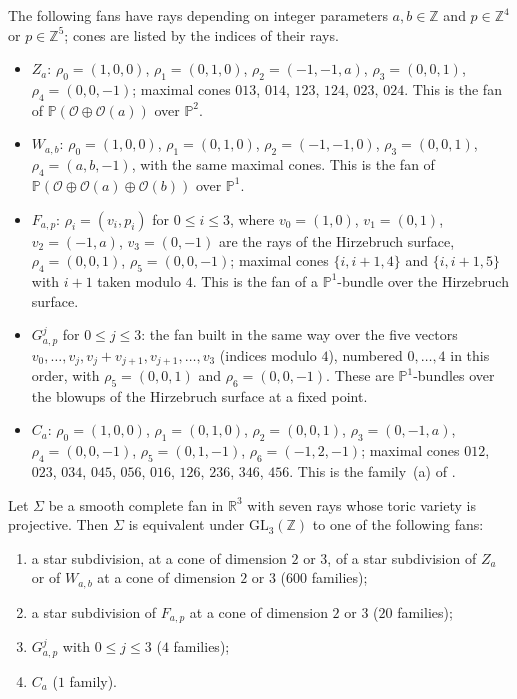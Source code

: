 \documentclass[12pt]{article}
\newcommand{\R}{\mathbb{R}}
\newcommand{\Z}{\mathbb{Z}}
\newcommand{\GL}{\mathrm{GL}}
\begin{document}
The following fans have rays depending on integer parameters $a,b\in\Z$ and $p\in\Z^4$ or $p\in\Z^5$; cones are listed by the indices of their rays.
\begin{itemize}
\item $Z_a$: $\rho_0=(1,0,0)$, $\rho_1=(0,1,0)$, $\rho_2=(-1,-1,a)$, $\rho_3=(0,0,1)$, $\rho_4=(0,0,-1)$; maximal cones $013$, $014$, $123$, $124$, $023$, $024$. This is the fan of $\mathbb{P}(\mathcal{O}\oplus\mathcal{O}(a))$ over $\mathbb{P}^2$.
\item $W_{a,b}$: $\rho_0=(1,0,0)$, $\rho_1=(0,1,0)$, $\rho_2=(-1,-1,0)$, $\rho_3=(0,0,1)$, $\rho_4=(a,b,-1)$, with the same maximal cones. This is the fan of $\mathbb{P}(\mathcal{O}\oplus\mathcal{O}(a)\oplus\mathcal{O}(b))$ over $\mathbb{P}^1$.
\item $F_{a,p}$: $\rho_i=(v_i,p_i)$ for $0\le i\le3$, where $v_0=(1,0)$, $v_1=(0,1)$, $v_2=(-1,a)$, $v_3=(0,-1)$ are the rays of the Hirzebruch surface, $\rho_4=(0,0,1)$, $\rho_5=(0,0,-1)$; maximal cones $\{i,i+1,4\}$ and $\{i,i+1,5\}$ with $i+1$ taken modulo $4$. This is the fan of a $\mathbb{P}^1$-bundle over the Hirzebruch surface.
\item $G^j_{a,p}$ for $0\le j\le3$: the fan built in the same way over the five vectors $v_0,\dots,v_j,v_j+v_{j+1},v_{j+1},\dots,v_3$ (indices modulo $4$), numbered $0,\dots,4$ in this order, with $\rho_5=(0,0,1)$ and $\rho_6=(0,0,-1)$. These are $\mathbb{P}^1$-bundles over the blowups of the Hirzebruch surface at a fixed point.
\item $C_a$: $\rho_0=(1,0,0)$, $\rho_1=(0,1,0)$, $\rho_2=(0,0,1)$, $\rho_3=(0,-1,a)$, $\rho_4=(0,0,-1)$, $\rho_5=(0,1,-1)$, $\rho_6=(-1,2,-1)$; maximal cones $012$, $023$, $034$, $045$, $056$, $016$, $126$, $236$, $346$, $456$. This is the family~(a) of \cite[Section~3]{FP05}.
\end{itemize}

\begin{proposition}\label{prop:classification}
Let $\Sigma$ be a smooth complete fan in $\R^3$ with seven rays whose toric variety is projective. Then $\Sigma$ is equivalent under $\GL_3(\Z)$ to one of the following fans:
\begin{enumerate}
\item[(i)] a star subdivision, at a cone of dimension $2$ or $3$, of a star subdivision of $Z_a$ or of $W_{a,b}$ at a cone of dimension $2$ or $3$ ($600$ families);
\item[(ii)] a star subdivision of $F_{a,p}$ at a cone of dimension $2$ or $3$ ($20$ families);
\item[(iii)] $G^j_{a,p}$ with $0\le j\le3$ ($4$ families);
\item[(iv)] $C_a$ ($1$ family).
\end{enumerate}
\end{proposition}
\end{document}
